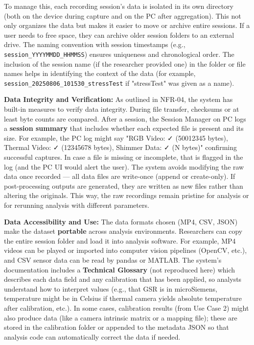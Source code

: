 To manage this, each recording session's data is isolated in its own
directory (both on the device during capture and on the PC after
aggregation). This not only organizes the data but makes it easier to
move or archive entire sessions. If a user needs to free space, they can
archive older session folders to an external drive. The naming
convention with session timestamps (e.g., \texttt{session_YYYYMMDD_HHMMSS})
ensures uniqueness and chronological order. The inclusion of the session
name (if the researcher provided one) in the folder or file names helps
in identifying the context of the data (for example,
\texttt{session_20250806_101530_stressTest} if "stressTest" was given as a
name).

\textbf{Data Integrity and Verification:} As outlined in NFR-04, the system
has built-in measures to verify data integrity. During file transfer,
checksums or at least byte counts are
compared\cite{ref54}.
After a session, the Session Manager on PC logs a \textbf{session summary}
that includes whether each expected file is present and its
size\cite{ref71}.
For example, the PC log might say "RGB Video: ✓ (50012345 bytes),
Thermal Video: ✓ (12345678 bytes), Shimmer Data: ✓ (N bytes)" confirming
successful captures. In case a file is missing or incomplete, that is
flagged in the log (and the PC UI would alert the user). The system
avoids modifying the raw data once recorded --- all data files are
write-once (append or create-only). If post-processing outputs are
generated, they are written as new files rather than altering the
originals. This way, the raw recordings remain pristine for analysis or
for rerunning analysis with different parameters.

\textbf{Data Accessibility and Use:} The data formats chosen (MP4, CSV, JSON)
make the dataset \textbf{portable} across analysis environments. Researchers
can copy the entire session folder and load it into analysis software.
For example, MP4 videos can be played or imported into computer vision
pipelines (OpenCV, etc.), and CSV sensor data can be read by pandas or
MATLAB. The system's documentation includes a \textbf{Technical Glossary}
(not reproduced here) which describes each data field and any
calibration that has been applied, so analysts understand how to
interpret values (e.g., that GSR is in microSiemens, temperature might
be in Celsius if thermal camera yields absolute temperature after
calibration, etc.). In some cases, calibration results (from Use Case 2)
might also produce data (like a camera intrinsic matrix or a mapping
file); these are stored in the calibration folder or appended to the
metadata JSON so that analysis code can automatically correct the data
if needed.

